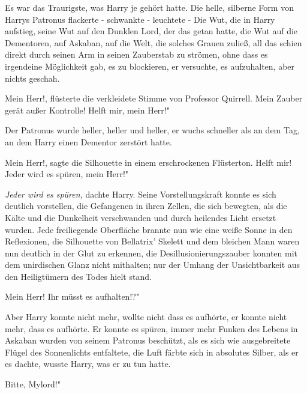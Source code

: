 Es war das Traurigste, was Harry je gehört hatte. Die helle, silberne Form von
Harrys Patronus flackerte - schwankte - leuchtete - Die Wut, die in Harry
aufstieg, seine Wut auf den Dunklen Lord, der das getan hatte, die Wut auf die
Dementoren, auf Askaban, auf die Welt, die solches Grauen zuließ, all das schien
direkt durch seinen Arm in seinen Zauberstab zu strömen, ohne dass es irgendeine
Möglichkeit gab, es zu blockieren, er versuchte, es aufzuhalten, aber nichts
geschah.

\glqq{}Mein Herr!\grqq{}, flüsterte die verkleidete Stimme von Professor
Quirrell. \glqq{}Mein Zauber gerät außer Kontrolle! Helft mir, mein Herr!"

Der Patronus wurde heller, heller und heller, er wuchs schneller als an dem Tag,
an dem Harry einen Dementor zerstört hatte.

\glqq{}Mein Herr!\grqq{}, sagte die Silhouette in einem erschrockenen Flüsterton.
\glqq{}Helft mir! Jeder wird es spüren, mein Herr!"

\emph{Jeder wird es spüren,} dachte Harry. Seine Vorstellungskraft konnte es
sich deutlich vorstellen, die Gefangenen in ihren Zellen, die sich bewegten, als
die Kälte und die Dunkelheit verschwanden und durch heilendes Licht ersetzt
wurden. Jede freiliegende Oberfläche brannte nun wie eine weiße Sonne in den
Reflexionen, die Silhouette von Bellatrix' Skelett und dem bleichen Mann waren
nun deutlich in der Glut zu erkennen, die Desillusionierungszauber konnten mit
dem unirdischen Glanz nicht mithalten; nur der Umhang der Unsichtbarkeit aus den
Heiligtümern des Todes hielt stand.

\glqq{}Mein Herr! Ihr müsst es aufhalten!?"

Aber Harry konnte nicht mehr, wollte nicht dass es aufhörte, er konnte nicht
mehr, dass es aufhörte. Er konnte es spüren, immer mehr Funken des Lebens in
Askaban wurden von seinem Patronus beschützt, als es sich wie ausgebreitete
Flügel des Sonnenlichts entfaltete, die Luft färbte sich in absolutes Silber,
als er es dachte, wusste Harry, was er zu tun hatte.

\glqq{}Bitte, Mylord!"


